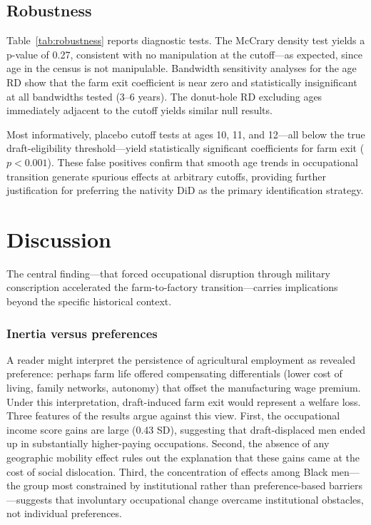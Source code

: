 \documentclass[12pt]{article}
\begin{document}


\subsection{Robustness}

Table~\ref{tab:robustness} reports diagnostic tests. The McCrary density test yields a p-value of 0.27, consistent with no manipulation at the cutoff---as expected, since age in the census is not manipulable. Bandwidth sensitivity analyses for the age RD show that the farm exit coefficient is near zero and statistically insignificant at all bandwidths tested (3--6 years). The donut-hole RD excluding ages immediately adjacent to the cutoff yields similar null results.

Most informatively, placebo cutoff tests at ages 10, 11, and 12---all below the true draft-eligibility threshold---yield statistically significant coefficients for farm exit ($p < 0.001$). These false positives confirm that smooth age trends in occupational transition generate spurious effects at arbitrary cutoffs, providing further justification for preferring the nativity DiD as the primary identification strategy.



\section{Discussion}

The central finding---that forced occupational disruption through military conscription accelerated the farm-to-factory transition---carries implications beyond the specific historical context.

\subsubsection*{Inertia versus preferences} A reader might interpret the persistence of agricultural employment as revealed preference: perhaps farm life offered compensating differentials (lower cost of living, family networks, autonomy) that offset the manufacturing wage premium. Under this interpretation, draft-induced farm exit would represent a welfare loss. Three features of the results argue against this view. First, the occupational income score gains are large (0.43 SD), suggesting that draft-displaced men ended up in substantially higher-paying occupations. Second, the absence of any geographic mobility effect rules out the explanation that these gains came at the cost of social dislocation. Third, the concentration of effects among Black men---the group most constrained by institutional rather than preference-based barriers---suggests that involuntary occupational change overcame institutional obstacles, not individual preferences.
\end{document}
